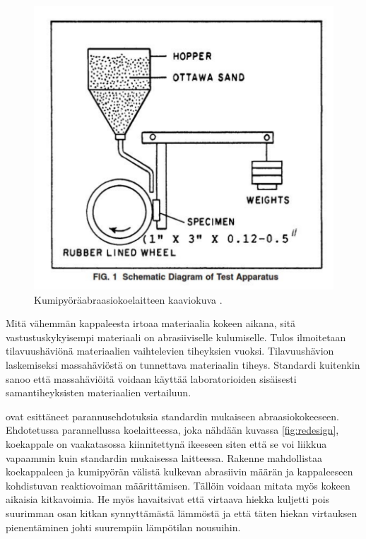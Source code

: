 \documentclass[12pt,a4paper,finnish]{tutthesis}
\begin{document}
\begin{figure}
  \begin{center}
    \includegraphics[scale=0.6]{G65}
  \end{center}
  \caption[Kumipyöräabraasiokoelaite]{Kumipyöräabraasiokoelaitteen kaaviokuva \parencite{Standard2010}.}
  \label{fig:G65}
\end{figure}



Mitä vähemmän kappaleesta irtoaa materiaalia kokeen aikana, sitä
vastustuskykyisempi materiaali on abrasiiviselle kulumiselle.
Tulos ilmoitetaan tilavuushäviönä materiaalien vaihtelevien tiheyksien
vuoksi. Tilavuushävion laskemiseksi massahäviöstä on tunnettava
materiaalin tiheys. Standardi kuitenkin sanoo että massahäviöitä
voidaan käyttää laboratorioiden sisäisesti samantiheyksisten
materiaalien vertailuun.

\textcite{Stevenson1996} ovat esittäneet parannusehdotuksia
standardin mukaiseen abraasiokokeeseen. Ehdotetussa parannellussa
koelaitteessa, joka nähdään kuvassa \ref{fig:redesign}, koekappale on vaakatasossa kiinnitettynä
ikeeseen siten että se voi liikkua vapaammin kuin standardin mukaisessa laitteessa.
Rakenne mahdollistaa koekappaleen ja kumipyörän välistä kulkevan abrasiivin
määrän ja kappaleeseen kohdistuvan reaktiovoiman määrittämisen.
Tällöin voidaan mitata myös kokeen aikaisia kitkavoimia.
He myös havaitsivat että virtaava hiekka kuljetti pois
suurimman osan kitkan synnyttämästä lämmöstä ja että täten hiekan virtauksen
pienentäminen johti suurempiin lämpötilan nousuihin.
\end{document}
